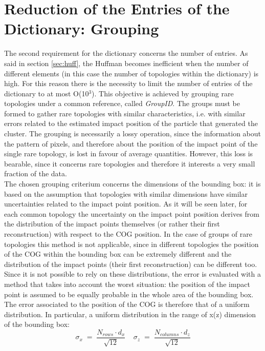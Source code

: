 \section{Reduction of the Entries of the Dictionary: Grouping}
\label{sec:group}
The second requirement for the dictionary concerns the number of entries. As said in section \ref{sec:huff}, the Huffman becomes inefficient when the number of different elements (in this case the number of topologies within the dictionary) is high. For this reason there is the necessity to limit the number of entries of the dictionary to at most O(10$^3$). This objective is achieved by grouping rare topologies under a common reference, called \textit{GroupID}. The groups must be formed to gather rare topologies with similar characteristics, i.e. with similar errors related to the estimated impact position of the particle that generated the cluster. The grouping is necessarily a lossy operation, since the information about the pattern of pixels, and therefore about the position of the impact point of the single rare topology, is lost in favour of average quantities. However, this loss is bearable, since it concerns rare topologies and therefore it interests a very small fraction of the data.\\
The chosen grouping criterium concerns the dimensions of the bounding box: it is based on the assumption that topologies with similar dimensions have similar uncertainties related to the impact point position. As it will be seen later, for each common topology the uncertainty on the impact point position derives from the distribution of the impact points themselves (or rather their first reconstruction) with respect to the COG position. In the case of groups of rare topologies this method is not applicable, since in different topologies the position of the COG within the bounding box can be extremely different and the distribution of the impact points (their first reconstruction) can be different too. Since it is not possible to rely on these distributions, the error is evaluated with a method that takes into account the worst situation: the position of the impact point is assumed to be equally probable in the whole area of the bounding box. The error associated to the position of the COG is therefore that of a uniform distribution. In particular, a uniform distribution in the range of x(z) dimension of the bounding box:
\begin{equation}
 \sigma_x \; = \; \frac{N_{rows} \cdot d_x}{\sqrt{12}} \ \ \ \ \  \sigma_z \; = \; \frac{N_{columns} \cdot d_z}{\sqrt{12}}
\end{equation}

